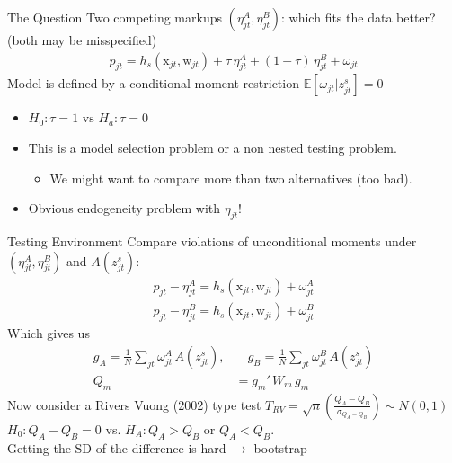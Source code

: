 \documentclass[aspectratio=169,10pt]{beamer}
\begin{document}
\begin{frame}{The Question}
Two competing markups $(\eta_{jt}^A, \eta_{jt}^B)$: which fits the data better?\\
(both may be misspecified)
\begin{align*}
p_{jt} = h_s(\textrm{x}_{jt},\textrm{w}_{jt}) + \tau\, \eta_{jt}^A + (1-\tau)\,\eta_{jt}^B + \omega_{jt}
\end{align*}
Model is defined by a conditional moment restriction $\mathbb{E}[\omega_{jt}  | z_{jt}^s]=0$
\begin{itemize}
\item $H_0: \tau =1 \text{ vs } H_a: \tau = 0$
\item This is a \alert{model selection} problem or a \alert{non nested testing} problem.
\begin{itemize}
\item We might want to compare more than two alternatives (too bad).
\end{itemize}
\item Obvious endogeneity problem with $\eta_{jt}$!
\end{itemize}
\end{frame}


\begin{frame}{Testing Environment}
Compare violations of unconditional moments under $(\eta_{jt}^A, \eta_{jt}^B)$ and $A(z_{jt}^s)$:
\begin{align*}
p_{jt} -  \eta_{jt}^A = h_s(\textrm{x}_{jt},\textrm{w}_{jt}) + \omega_{jt}^{A}\\
p_{jt} -  \eta_{jt}^B = h_s(\textrm{x}_{jt},\textrm{w}_{jt}) + \omega_{jt}^{B}
\end{align*}
\pause
Which gives us
\begin{align*}
g_A = \frac{1}{N} \sum_{jt} \omega_{jt}^{A}\, A(z_{jt}^s), &\quad
g_B =\frac{1}{N} \sum_{jt}  \omega_{jt}^{B}\, A(z_{jt}^s)\\
Q_m &= g_m'\, W_m\, g_m
\end{align*}
Now consider a \alert{Rivers Vuong (2002)} type test $T_{RV} = \sqrt{n} \left(\frac{Q_A - Q_B}{\sigma_{Q_A - Q_B}}\right) \sim N(0,1)$
$H_0: Q_A - Q_B=0$ vs. $H_A: Q_A > Q_B$ or $Q_A < Q_B$.\\
Getting the SD of the difference is hard $\rightarrow$ bootstrap 
\end{frame}
\end{document}
